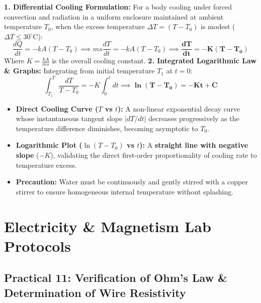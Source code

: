 \documentclass[10pt,twoside,openright]{book}
\begin{document}
\begin{conceptbox}
\textbf{1. Differential Cooling Formulation:}
For a body cooling under forced convection and radiation in a uniform enclosure maintained at ambient temperature $T_0$, when the excess temperature $\Delta T = (T - T_0)$ is modest ($\Delta T \le 30^\circ\mathrm{C}$):
\begin{equation}
  \frac{dQ}{dt} = -k A (T - T_0) \implies m s \frac{dT}{dt} = -k A (T - T_0) \implies \mathbf{\frac{dT}{dt} = -K (T - T_0)}
\end{equation}
Where $K = \frac{kA}{ms}$ is the overall cooling constant.
\textbf{2. Integrated Logarithmic Law \& Graphs:}
Integrating from initial temperature $T_1$ at $t = 0$:
\begin{equation}
  \int_{T_1}^T \frac{dT}{T - T_0} = -K \int_0^t dt \implies \mathbf{\ln(T - T_0) = -K t + C}
\end{equation}
\begin{itemize}
  \item \textbf{Direct Cooling Curve ($T$ vs $t$):} A non-linear exponential decay curve whose instantaneous tangent slope $|dT/dt|$ decreases progressively as the temperature difference diminishes, becoming asymptotic to $T_0$.
  \item \textbf{Logarithmic Plot ($\ln(T - T_0)$ vs $t$):} A \textbf{straight line with negative slope} ($-K$), validating the direct first-order proportionality of cooling rate to temperature excess.
  \item \textbf{Precaution:} Water must be continuously and gently stirred with a copper stirrer to ensure homogeneous internal temperature without splashing.
\end{itemize}
\end{conceptbox}

\section{Electricity \& Magnetism Lab Protocols}

\subsection{Practical 11: Verification of Ohm's Law \& Determination of Wire Resistivity}
\end{document}
